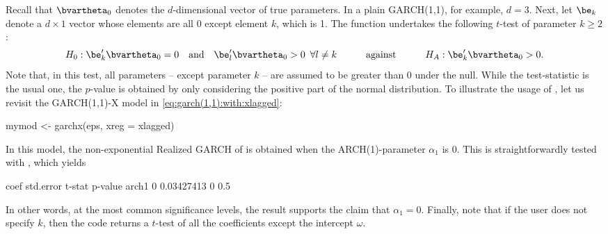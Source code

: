 Recall that $\bvartheta_0$ denotes the $d$-dimensional vector of true parameters. In a plain GARCH(1,1), for example, $d=3$. Next, let $\be_k$ denote a $d\times 1$ vector whose elements are all 0 except element $k$, which is 1. The function  undertakes the following $t$-test of parameter $k\geq 2$:
%
\begin{equation*}
	H_0: \be_k'\bvartheta_0 = 0 \quad\text{and}\quad \be_l'\bvartheta_0 > 0 \,\,\,\forall l\neq k \quad\quad\quad\text{against}\quad\quad\quad H_A: \be_k'\bvartheta_0 > 0.
\end{equation*}
%
Note that, in this test, all parameters -- except parameter $k$ -- are assumed to be greater than 0 under the null. While the test-statistic is the usual one, the $p$-value is obtained by only considering the positive part of the normal distribution. To illustrate the usage of , let us revisit the GARCH(1,1)-X model in \eqref{eq:garch(1,1):with:xlagged}:
%
\begin{example}
	mymod <- garchx(eps, xreg = xlagged)
\end{example}
%
In this model, the non-exponential Realized GARCH of \citet{HansenHuangSchek2012} is obtained when the ARCH(1)-parameter $\alpha_1$ is 0. This is straightforwardly tested with , which yields
%
\begin{example}
	      coef  std.error t-stat p-value
	arch1    0 0.03427413      0     0.5
\end{example}
%
In other words, at the most common significance levels, the result supports the claim that $\alpha_1=0$. Finally, note that if the user does not specify $k$, then the code  returns a $t$-test of all the coefficients except the intercept $\omega$.


